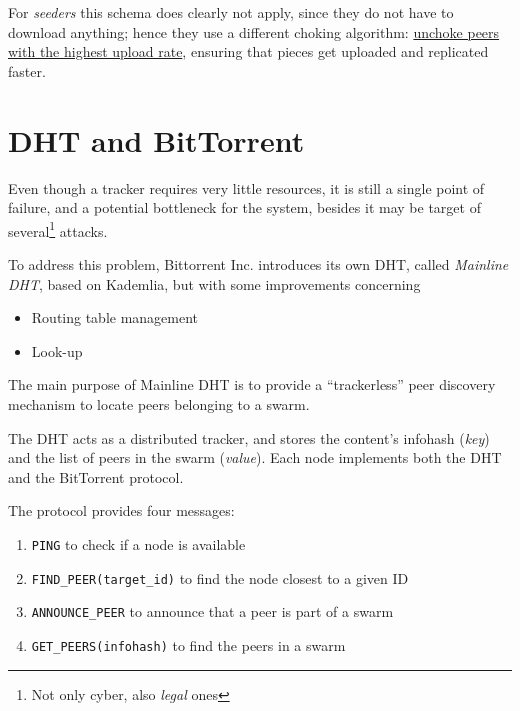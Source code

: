 For \textit{seeders} this schema does clearly not apply, since they do not have to download anything; hence they use a different choking algorithm:
\ul{unchoke peers with the highest upload rate}, ensuring that pieces get uploaded and replicated faster.

\section{DHT and BitTorrent}
Even though a tracker requires very little resources, it is still a single point of failure, and a potential bottleneck for the system, besides it may be target of several\footnote{Not only cyber, also \textit{legal} ones} attacks.

To address this problem, Bittorrent Inc. introduces its own DHT, called \textit{Mainline DHT},
based on Kademlia, but with some improvements concerning 
\begin{itemize}
   \item Routing table management
   \item Look-up
\end{itemize}
The main purpose of Mainline DHT is to provide a “trackerless” peer discovery mechanism to locate peers belonging to a swarm.

The DHT acts as a distributed tracker, and stores the content's infohash (\textit{key}) and the list of peers in the swarm (\textit{value}).
Each node implements both the DHT and the BitTorrent protocol.

The protocol provides four messages:
\begin{enumerate}
   \item \texttt{PING} to check if a node is available
   \item \texttt{FIND\_PEER(target\_id)} to find the node closest to a given ID
   \item \texttt{ANNOUNCE\_PEER} to announce that a peer is part of a swarm
   \item \texttt{GET\_PEERS(infohash)} to find the peers in a swarm
\end{enumerate}

